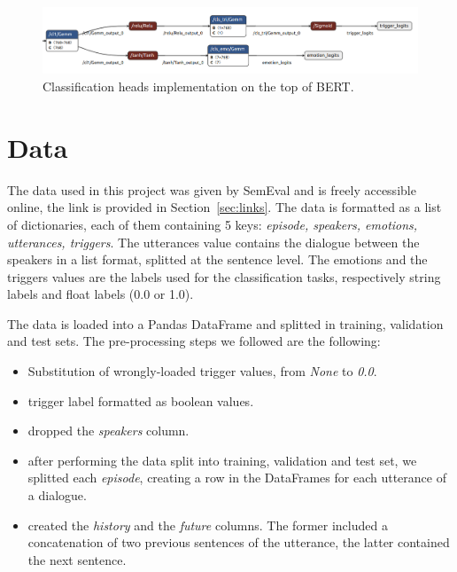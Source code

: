 \documentclass[11pt,table,xcdraw]{article}
\begin{document}
\begin{figure}
    \centering
    \includegraphics[width=\textwidth]{img/heads.png}
    \caption{Classification heads implementation on the top of BERT.}
    \label{fig:cls_model}
\end{figure}



\section{Data}
\label{sec:data}

The data used in this project was given by SemEval and is freely accessible online, the link is provided in Section~\ref{sec:links}. The data is formatted as a list of dictionaries, each of them containing 5 keys: \textit{episode, speakers, emotions, utterances, triggers}. The utterances value contains the dialogue between the speakers in a list format, splitted at the sentence level. The emotions and the triggers values are the labels used for the classification tasks, respectively string labels and float labels (0.0 or 1.0). 

The data is loaded into a Pandas DataFrame and splitted in training, validation and test sets.
The pre-processing steps we followed are the following:
\begin{itemize}
    \item Substitution of wrongly-loaded trigger values, from \textit{None} to \textit{0.0}.
    \item trigger label formatted as boolean values.
    \item dropped the \textit{speakers} column.
    \item after performing the data split into training, validation and test set, we splitted each \textit{episode}, creating a row in the DataFrames for each utterance of a dialogue.
    \item created the \textit{history} and the \textit{future} columns. The former included a concatenation of two previous sentences of the utterance, the latter contained the next sentence.
\end{itemize}
\end{document}
